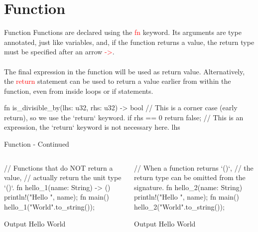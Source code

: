 \documentclass[10pt,xcolor={dvipsnames}, aspectratio=169]{beamer}
\begin{document}
\section{Function}
\begin{frame}[fragile]{Function}
	    Functions are declared using the \textcolor{red}{fn} keyword. Its arguments are type annotated, just like variables, and, if the function returns a value, the return type must be specified after an arrow \textcolor{red}{->}. \\ \\
        The final expression in the function will be used as return value. Alternatively, the \textcolor{red}{return} statement can be used to return a value earlier from within the function, even from inside loops or if statements. \\
	   \begin{rustcode}
fn is_divisible_by(lhs: u32, rhs: u32) -> bool {
    // This is a corner case (early return), so we use the `return` keyword.
    if rhs == 0 { return false; }
    // This is an expression, the `return` keyword is not necessary here.
    lhs %
}
        \end{rustcode}

\end{frame}
\begin{frame}[fragile]{Function - Continued}
	 \begin{columns}
	 \begin{column}{0.5 \textwidth}
	        \begin{rustcode}
// Functions that do NOT return a value,
// actually return the unit type `()`.
fn hello_1(name: String) -> () {
    println!("Hello {}", name);
}
fn main() {
    hello_1("World".to_string());
}
        \end{rustcode}
    \begin{block}{Output}
		Hello World
	\end{block}
    \end{column}
	\begin{column}{0.5 \textwidth}
		    \begin{rustcode}
// When a function returns `()`, 
// the return type can be omitted from the signature.
fn hello_2(name: String) {
    println!("Hello {}", name);
}
fn main() {
    hello_2("World".to_string());
}
        \end{rustcode}
    \begin{block}{Output}
		Hello World
	\end{block}
    \end{column}

    \end{columns}
\end{frame}
\end{document}
